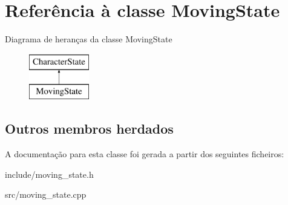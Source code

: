 \hypertarget{classMovingState}{}\section{Referência à classe Moving\+State}
\label{classMovingState}
Diagrama de heranças da classe Moving\+State\begin{figure}[H]
\begin{center}
\leavevmode
\includegraphics[height=2.000000cm]{classMovingState}
\end{center}
\end{figure}
\subsection*{Outros membros herdados}


A documentação para esta classe foi gerada a partir dos seguintes ficheiros\+:\begin{DoxyCompactItemize}
\item 
include/moving\+\_\+state.\+h\item 
src/moving\+\_\+state.\+cpp\end{DoxyCompactItemize}
